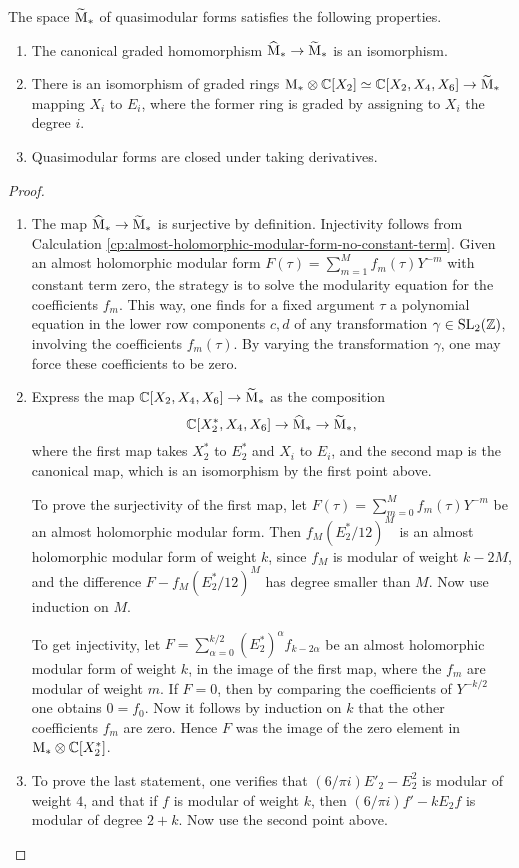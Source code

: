 \begin{prop} The space $\widetilde{\mathrm{M}}_*$ of quasimodular forms satisfies the following properties.
 \begin{enumerate}
  \item The canonical graded homomorphism $\widehat{\mathrm{M}}_* \to \widetilde{\mathrm{M}}_*$ is an isomorphism.
  \item There is an isomorphism of graded rings $\mathrm{M}_* \otimes \mathbb{C}[X_2] \simeq \mathbb{C}[X_2, X_4, X_6]\to \widetilde{\mathrm{M}}_*$ mapping $X_i$ to $E_i$, where the former ring is graded by assigning to $X_i$ the degree $i$.
  \item Quasimodular forms are closed under taking derivatives.
 \end{enumerate}
\end{prop}
\begin{proof}
 \begin{enumerate}
  \item The map $\widehat{\mathrm{M}}_* \to \widetilde{\mathrm{M}}_*$ is surjective by definition. Injectivity follows from Calculation \ref{cp:almost-holomorphic-modular-form-no-constant-term}. Given an almost holomorphic modular form $F(\tau)=\sum_{m=1}^Mf_m(\tau)Y^{-m}$ with constant term zero, the strategy is to solve the modularity equation for the coefficients $f_m$. This way, one finds for a fixed argument $\tau$ a polynomial equation in the lower row components  $c,d$ of any transformation $\gamma \in \operatorname{SL}_2(\mathbb{Z})$, involving the coefficients $f_m(\tau)$. By varying the transformation $\gamma$, one may force these coefficients to be zero.
  \item Express the map $\mathbb{C}[X_2, X_4, X_6]\to \widetilde{\mathrm{M}}_*$ as the composition \[\mathbb{C}[X^*_2, X_4, X_6]\to \widehat{\mathrm{M}}_* \to \widetilde{\mathrm{M}}_*,\] where the first map takes $X^*_2$ to $E_2^*$ and $X_i$ to $E_i$, and the second map is the canonical map, which is an isomorphism by the first point above.
  
  To prove the surjectivity of the first map, let $F(\tau)=\sum_{m=0}^Mf_m(\tau)Y^{-m}$ be an almost holomorphic modular form. Then $f_M (E_2^*/12)^M$ is an almost holomorphic modular form of weight $k$, since $f_M$ is modular of weight $k-2M$, and the difference $F - f_M (E_2^*/12)^M$ has degree smaller than $M$. Now use induction on $M$.
  
  To get injectivity, let $F=\sum_{\alpha=0}^{k/2}(E_2^*)^\alpha f_{k-2\alpha}$ be an almost holomorphic modular form of weight $k$, in the image of the first map, where the $f_m$ are modular of weight $m$. If $F=0$, then by comparing the coefficients of $Y^{-k/2}$ one obtains $0=f_0$. Now it follows by induction on $k$ that the other coefficients $f_m$ are zero. Hence $F$ was the image of the zero element in $\mathrm{M}_* \otimes \mathbb{C}[X^*_2]$.
  \item To prove the last statement, one verifies that $(6/\pi i) E'_2-E_2^2$ is modular of weight $4$, and that if $f$ is modular of weight $k$, then $(6/\pi i)f' - kE_2f$ is modular of degree $2+k$. Now use the second point above.
 \end{enumerate}

\end{proof}


